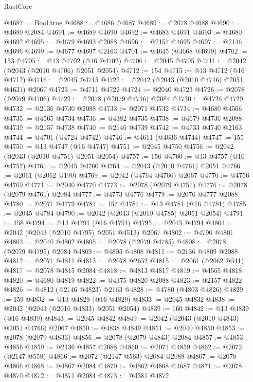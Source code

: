 \begin{lexlean}{RustCore}
\begin{coremodule}
@4687 := Bool.true
@4688 := @4686 @4687
@4689 := @2078 @4688
@4690 := @4689 @2084
@4691 := @4689 @4690
@4692 := @4683 @4691
@4693 := @4680 @4692
@4695 := @4679 @4693 @2088
@4696 := @2157 @4695
@4697 := @2146 @4696
@4699 := @4677 @4697 @2163
@4701 := @4645 (@4668 @4699)
@4702 := 153
@4705 := @13 @4702 (@16 @4702)
@4706 := @2045 @4705
@4711 := @2042 (@2043 (@2010 @4706) @2051 @2054)
@4712 := 154
@4715 := @13 @4712 (@16 @4712)
@4716 := @2045 @4715
@4722 := @2042 (@2043 (@2010 @4716) @2051 @4631) @2067
@4723 := @4711 @4722
@4724 := @2040 @4723
@4726 := @2078 (@2079 @4706)
@4729 := @2078 (@2079 @4716) @2084
@4730 := @4726 @4729
@4732 := @2136 @4730 @2088
@4733 := @2071 @4732
@4734 := @4680 @4566
@4735 := @4565 @4734
@4736 := @4382 @4735
@4738 := @4679 @4736 @2088
@4739 := @2157 @4738
@4740 := @2146 @4739
@4742 := @4733 @4740 @2163
@4744 := @4701 (@4724 @4742)
@4746 := @4611 (@4636 @4744)
@4747 := 155
@4750 := @13 @4747 (@16 @4747)
@4751 := @2045 @4750
@4756 := @2042 (@2043 (@2010 @4751) @2051 @2054)
@4757 := 156
@4760 := @13 @4757 (@16 @4757)
@4761 := @2045 @4760
@4764 := @2043 (@2010 @4761) @2051
@4766 := @2061 (@2062 @190)
@4769 := @2042 (@4764 @4766) @2067
@4770 := @4756 @4769
@4771 := @2040 @4770
@4773 := @2078 (@2079 @4751)
@4776 := @2078 (@2079 @4761) @2084
@4777 := @4773 @4776
@4779 := @2076 @4777 @2088
@4780 := @2071 @4779
@4781 := 157
@4784 := @13 @4781 (@16 @4781)
@4785 := @2045 @4784
@4790 := @2042 (@2043 (@2010 @4785) @2051 @2054)
@4791 := 158
@4794 := @13 @4791 (@16 @4791)
@4795 := @2045 @4794
@4801 := @2042 (@2043 (@2010 @4795) @2051 @4513) @2067
@4802 := @4790 @4801
@4803 := @2040 @4802
@4805 := @2078 (@2079 @4785)
@4808 := @2078 (@2079 @4795) @2084
@4809 := @4805 @4808
@4811 := @2136 @4809 @2088
@4812 := @2071 @4811
@4813 := @2078 @2652
@4815 := @2061 (@2062 @541)
@4817 := @2078 @4815 @2084
@4818 := @4813 @4817
@4819 := @4565 @4818
@4820 := @4680 @4819
@4822 := @4375 @4820 @2088
@4823 := @2157 @4822
@4826 := @4812 (@2146 @4823) @2163
@4828 := @4780 (@4803 @4826)
@4829 := 159
@4832 := @13 @4829 (@16 @4829)
@4833 := @2045 @4832
@4838 := @2042 (@2043 (@2010 @4833) @2051 @2054)
@4839 := 160
@4842 := @13 @4839 (@16 @4839)
@4843 := @2045 @4842
@4849 := @2042 (@2043 (@2010 @4843) @2051 @4766) @2067
@4850 := @4838 @4849
@4851 := @2040 @4850
@4853 := @2078 (@2079 @4833)
@4856 := @2078 (@2079 @4843) @2084
@4857 := @4853 @4856
@4859 := @2136 @4857 @2088
@4860 := @2071 @4859
@4862 := @2072 (@2147 @558)
@4866 := @2072 (@2147 @563) @2084 @2088
@4867 := @2078 @4866
@4868 := @4867 @2084
@4870 := @4862 @4868 @4687
@4871 := @2078 @4870
@4872 := @4871 @2084
@4873 := @4381 @4872

\end{coremodule}
\end{lexlean}

